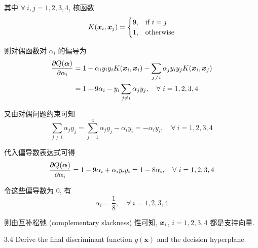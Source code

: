 \documentclass{article}
\begin{document}
其中 $\forall~i,j=1,2,3,4$, 核函数
\begin{equation}
  K(\bm{x}_i,\bm{x}_j)=
  \begin{cases}
    9,&\text{if}~i=j\\
    1,&\text{otherwise}
  \end{cases}
\end{equation}

则对偶函数对 $\alpha_i$ 的偏导为
\begin{equation}
  \begin{aligned}
    \frac{\partial Q(\bm{\alpha})}{\partial\alpha_i}
    &=1-\alpha_iy_iy_iK(\bm{x}_i,\bm{x}_i)-\sum_{j\neq i}\alpha_jy_iy_jK(\bm{x}_i,\bm{x}_j)\\
    &=1-9\alpha_i-y_i\sum_{j\neq i}\alpha_jy_j,\quad\forall~i=1,2,3,4
  \end{aligned}
\end{equation}

又由对偶问题约束可知
\begin{equation}
  \sum_{j\neq i}\alpha_jy_j=\sum_{j=1}^4\alpha_jy_j-\alpha_iy_i=-\alpha_iy_i,\quad\forall~i=1,2,3,4
\end{equation}

代入偏导数表达式可得
\begin{equation}
  \frac{\partial Q(\bm{\alpha})}{\partial\alpha_i}
  =1-9\alpha_i+\alpha_iy_iy_i=1-8\alpha_i,\quad\forall~i=1,2,3,4
\end{equation}

令这些偏导数为 0, 有
\begin{equation}
  \alpha_i=\frac{1}{8},\quad\forall~i=1,2,3,4
\end{equation}

则由互补松弛 (complementary slackness) 性可知, $\bm{x}_i$, $i=1,2,3,4$ 都是支持向量.

3.4 Derive the final discriminant function $g(\bm{x})$ and the decision hyperplane.
\end{document}

